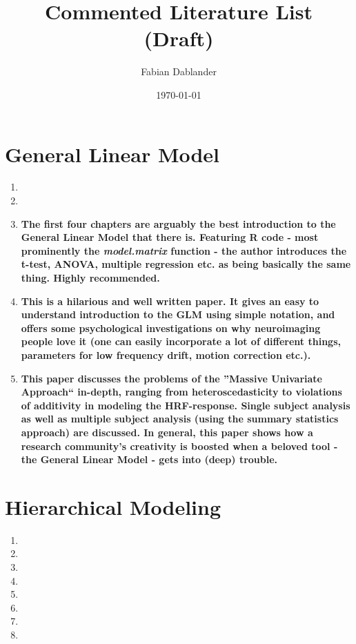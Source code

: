 \documentclass[12pt]{scrartcl}
\title{Commented Literature List \\ (Draft)}
\author{Fabian Dablander}
\date{\today}
\begin{document}
\maketitle

\section{General Linear Model}
\begin{enumerate}[label=-]
  \item {}
  \item {}
  
  \item {}
  
  \textbf{The first four chapters are arguably the best introduction to the General Linear Model that there is. Featuring R code - most prominently the
  \emph{model.matrix} function - the author introduces the t-test, ANOVA, multiple regression etc. as being basically the same thing. Highly recommended.}
  
  
  \item {}
  
  \textbf{This is a hilarious and well written paper. It gives an easy to understand introduction to the GLM using simple notation, and offers some psychological investigations on why neuroimaging people love it (one can easily incorporate a lot of different things, parameters for low frequency drift, motion correction etc.).}
  \item {}
  
  \textbf{This paper discusses the problems of the ''Massive Univariate Approach`` in-depth, ranging from heteroscedasticity to violations of additivity in modeling the HRF-response. Single subject analysis as well as multiple subject analysis (using the summary statistics approach) are discussed. In general, this paper shows how a research community's creativity is boosted when a beloved tool - the General Linear Model - gets into (deep) trouble.}
\end{enumerate}

\section{Hierarchical Modeling}
\begin{enumerate}[label=-]
    \item {}
    \item {}
    \item {}
    \item {}
    \item {}
    \item {}
    \item {}
    \item {}
\end{enumerate}
\end{document}
